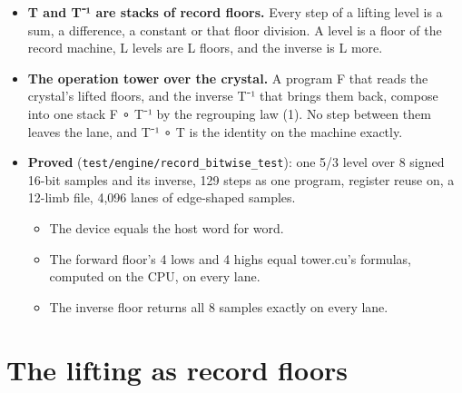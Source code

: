 \begin{itemize}
\begin{itemize}
\item The and reads v's two's complement without end. With the never-negative mask 2\textasciicircum{}k − 1 it gives v's residue modulo 2\textasciicircum{}k, in [0, 2\textasciicircum{}k), for a negative v as for a positive one.
\item v less its residue is a multiple of 2\textasciicircum{}k. The exact quotient divides it with nothing left over, and the quotient rounds toward −∞, as \texttt{tower\_\allowbreak{}floor\_\allowbreak{}shift} does.
\item The residue is no wider than the mask, k bits, by the never-negative width rule (3).
\end{itemize}
\item \textbf{T and T⁻¹ are stacks of record floors.} Every step of a lifting level is a sum, a difference, a constant or that floor division. A level is a floor of the record machine, L levels are L floors, and the inverse is L more.
\item \textbf{The operation tower over the crystal.} A program F that reads the crystal's lifted floors, and the inverse T⁻¹ that brings them back, compose into one stack F ∘ T⁻¹ by the regrouping law (1). No step between them leaves the lane, and T⁻¹ ∘ T is the identity on the machine exactly.
\item \textbf{Proved} (\texttt{test/\allowbreak{}engine/\allowbreak{}record\_\allowbreak{}bitwise\_\allowbreak{}test}): one 5/3 level over 8 signed 16-bit samples and its inverse, 129 steps as one program, register reuse on, a 12-limb file, 4,096 lanes of edge-shaped samples.

\begin{itemize}
\item The device equals the host word for word.
\item The forward floor's 4 lows and 4 highs equal tower.cu's formulas, computed on the CPU, on every lane.
\item The inverse floor returns all 8 samples exactly on every lane.
\end{itemize}
\end{itemize}

\section{\texorpdfstring{The lifting as record floors}{The lifting as record floors}}

